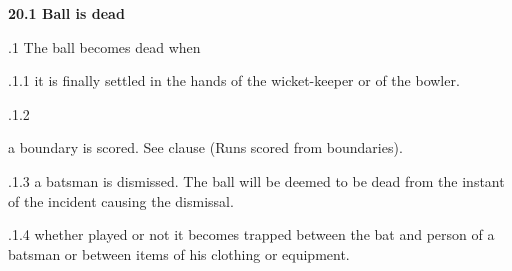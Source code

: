 \documentclass[12pt]{article}
\begin{document}
\vspace{\baselineskip}
{\fontsize{11pt}{13.2pt}\selectfont \textbf{20.1 \tabto{0.47in} Ball is dead}\par}\par


\vspace{\baselineskip}
{\fontsize{9pt}{10.8pt}.1 \tabto{0.49in} The ball becomes dead when\par}\par


\vspace{\baselineskip}
\begin{adjustwidth}{0.49in}{0.0in}
{\fontsize{9pt}{10.8pt}.1.1 \tabto{1.17in} it is finally settled in the hands of the wicket-keeper or of the bowler.\par}\par

\end{adjustwidth}


\vspace{\baselineskip}
\begin{adjustwidth}{0.49in}{0.0in}
{\fontsize{9pt}{10.8pt}.1.2 \tabto{1.17in} {\fontsize{8pt}{9.6pt}\selectfont a boundary is scored. See clause (Runs scored from boundaries).\par}\par}\par

\end{adjustwidth}


\vspace{\baselineskip}
\begin{adjustwidth}{1.18in}{0.31in}
{\fontsize{9pt}{10.8pt}.1.3 \tabto{1.17in} a batsman is dismissed. The ball will be deemed to be dead from the instant of the incident causing the dismissal.\par}\par

\end{adjustwidth}


\vspace{\baselineskip}
\begin{adjustwidth}{1.18in}{0.03in}
{\fontsize{9pt}{10.8pt}.1.4 \tabto{1.17in} whether played or not it becomes trapped between the bat and person of a batsman or between items of his clothing or equipment.\par}\par

\end{adjustwidth}
\end{document}
